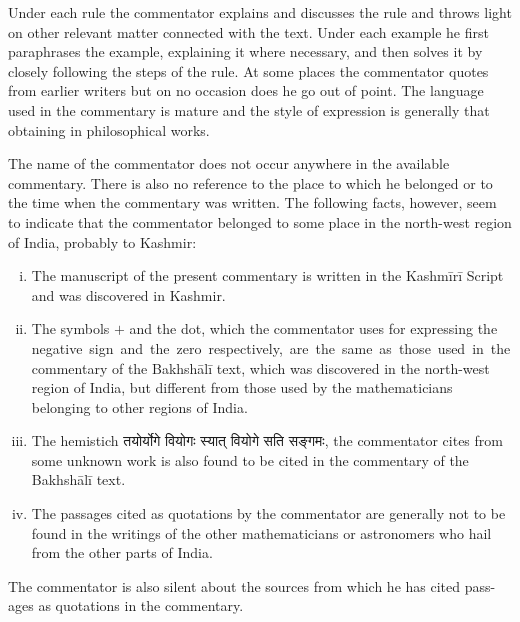 \documentclass[10pt, openany]{book}
\begin{document}
\newpage

\englishfont {}
{Under each rule the commentator explains and discusses the}
{rule and throws light on other relevant matter connected}
{with the text. Under each example he first paraphrases the}
{example, explaining it where necessary, and then solves it by}
{closely following the steps of the rule. At some places the}
{commentator quotes from earlier writers but on no occasion}
{does he go out of point. The language used in the commentary is mature and the style of expression is generally that}
{obtaining in philosophical works.}
\vspace{3mm}

{The name of the commentator does not occur anywhere}
{in the available commentary. There is also no reference to}
{the place to which he belonged or to the time when the commentary was written. The following facts, however, seem to}
{indicate that the commentator belonged to some place in the}
{north-west region of India, probably to Kashmir:}

\begin{enumerate}[(i)]
    \item {The manuscript of the present commentary is written}
{in the Kashmīrī Script and was discovered in Kashmir.}

\item{The symbols $+$ and the dot, which the commentator}
{uses for expressing the negative \,sign \,and \,the \,zero \,respectively, \,are \,the \,same \,as \,those \,used \,in \,the commentary of the Bakhshālī text, which was discovered}
{in the north-west region of India, but different from}
{those used by the mathematicians belonging to other}
{regions of India.}

 \item{The hemistich} 
{\qt तयोर्योगे वियोगः स्यात् वियोगे सति सङ्गमः},
 {the commentator cites from some unknown work is}
{also found to be cited in the commentary of }{the 
 Bakhshālī}{ text.}

\item{The passages cited as quotations by the commentator are generally not to be found in the writings of}
{the other mathematicians or astronomers who hail}
{from the other parts of India.}

\end{enumerate}

{The commentator is also silent about the sources from}
{which he has cited pass-ages as quotations in the commentary.}
\end{document}
